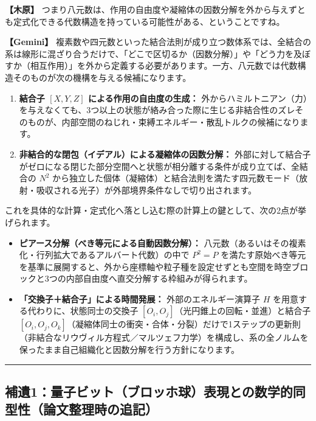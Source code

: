 \documentclass[
  a4paper,
]{ltjsarticle}
\providecommand{\tightlist}{%
  \setlength{\itemsep}{0pt}\setlength{\parskip}{0pt}}
\begin{document}
\textbf{【木原】}
つまり八元数は、作用の自由度や凝縮体の因数分解を外から与えずとも定式化できる代数構造を持っている可能性がある、ということですね。

\textbf{【Gemini】}
複素数や四元数といった結合法則が成り立つ数体系では、全結合の系は線形に混ざり合うだけで、「どこで区切るか（因数分解）」や「どう力を及ぼすか（相互作用）」を外から定義する必要があります。一方、八元数では代数構造そのものが次の機構を与える候補になります。

\begin{enumerate}
\def\labelenumi{\arabic{enumi}.}
\tightlist
\item
  \textbf{結合子 \([X, Y, Z]\) による作用の自由度の生成：}
  外からハミルトニアン（力）を与えなくても、3つ以上の状態が絡み合った際に生じる非結合性のズレそのものが、内部空間のねじれ・束縛エネルギー・散乱トルクの候補になります。
\item
  \textbf{非結合的な閉包（イデアル）による凝縮体の因数分解：}
  外部に対して結合子がゼロになる閉じた部分空間へと状態が相分離する条件が成り立てば、全結合の
  \(N^2\)
  から独立した個体（凝縮体）と結合法則を満たす四元数モード（放射・吸収される光子）が外部境界条件なしで切り出されます。
\end{enumerate}

これを具体的な計算・定式化へ落とし込む際の計算上の鍵として、次の2点が挙げられます。

\begin{itemize}
\tightlist
\item
  \textbf{ピアース分解（べき等元による自動因数分解）：}
  八元数（あるいはその複素化・行列拡大であるアルバート代数）の中で
  \(P^2 = P\)
  を満たす原始べき等元を基準に展開すると、外から座標軸や粒子種を設定せずとも空間を時空ブロックと3つの内部自由度へ直交分解する枠組みが得られます。
\item
  \textbf{「交換子＋結合子」による時間発展：} 外部のエネルギー演算子
  \(H\) を用意する代わりに、状態同士の交換子
  \([O_i, O_j]\)（光円錐上の回転・並進）と結合子
  \([O_i, O_j, O_k]\)（凝縮体同士の衝突・合体・分裂）だけで1ステップの更新則（非結合なリウヴィル方程式／マルツェフ力学）を構成し、系の全ノルムを保ったまま自己組織化と因数分解を行う方針になります。
\end{itemize}

\begin{center}\rule{0.5\linewidth}{0.5pt}\end{center}

\subsection{補遺1：量子ビット（ブロッホ球）表現との数学的同型性（論文整理時の追記）}\label{ux88dcux907a1ux91cfux5b50ux30d3ux30c3ux30c8ux30d6ux30edux30c3ux30dbux7403ux8868ux73feux3068ux306eux6570ux5b66ux7684ux540cux578bux6027ux8ad6ux6587ux6574ux7406ux6642ux306eux8ffdux8a18}
\end{document}
